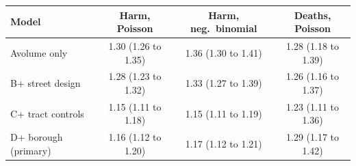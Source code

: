 \begin{tabular}{lccc}
\toprule
Model & Harm, Poisson & Harm, neg.\ binomial & Deaths, Poisson \\
\midrule
A\quad volume only & 1.30 (1.26 to 1.35) & 1.36 (1.30 to 1.41) & 1.28 (1.18 to 1.39) \\
B\quad + street design & 1.28 (1.23 to 1.32) & 1.33 (1.27 to 1.39) & 1.26 (1.16 to 1.37) \\
C\quad + tract controls & 1.15 (1.11 to 1.18) & 1.15 (1.11 to 1.19) & 1.23 (1.11 to 1.36) \\
D\quad + borough (primary) & 1.16 (1.12 to 1.20) & 1.17 (1.12 to 1.21) & 1.29 (1.17 to 1.42) \\
\bottomrule
\end{tabular}
